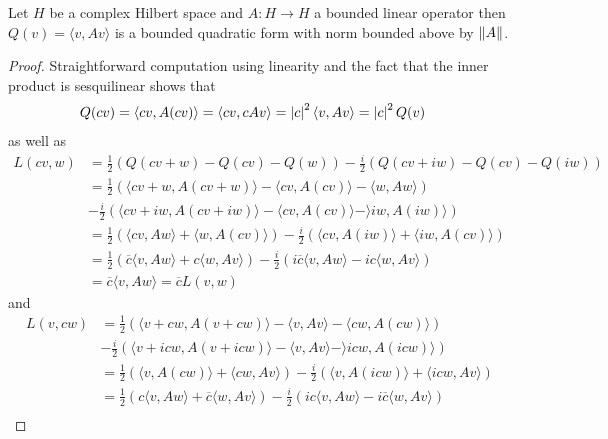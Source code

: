 \begin{prop}\label{hilbert:QuadraticFormFromOperator}Let $H$ be a complex Hilbert space and $A : H \to H$ a bounded linear operator then $Q(v) = \langle v, A v \rangle$ is a bounded quadratic form with norm bounded above by $\left \lVert A \right \rVert$.
\end{prop}
\begin{proof}
Straightforward computation using linearity and the fact that the inner product is sesquilinear shows that 
\begin{align*}
Q(cv) &= \langle cv, A (cv) \rangle = \langle cv, c A v \rangle = \left \vert c \right \vert^2 \langle v, A v \rangle = \left \vert c \right \vert^2Q(v)
\end{align*}
as well as 
\begin{align*}
L(cv, w) &= \frac{1}{2} \left ( Q(cv+w) - Q(cv) - Q(w) \right) - \frac{i}{2} \left (Q(cv+iw) - Q(cv) - Q(iw) \right) \\
&= \frac{1}{2} \left ( \langle cv+w, A(cv+w) \rangle - \langle cv, A(cv) \rangle - \langle w, Aw \rangle \right) \\
&- \frac{i}{2} \left ( \langle cv+iw, A(cv + iw) \rangle - \langle cv, A(cv) \rangle - \rangle iw, A(iw) \rangle \right) \\
&= \frac{1}{2} \left ( \langle cv, Aw \rangle + \langle w, A(cv) \rangle \right) - \frac{i}{2} \left ( \langle cv, A(iw) \rangle + \langle iw, A(cv) \rangle \right) \\
&= \frac{1}{2} \left ( \overline{c} \langle v, Aw \rangle + c \langle w, Av \rangle \right) - \frac{i}{2} \left ( i \overline{c} \langle v, Aw \rangle - ic\langle w, Av \rangle \right) \\
&= \overline{c} \langle v, Aw \rangle = \overline{c} L(v,w)
\end{align*}
and
\begin{align*}
L(v, cw) 
&= \frac{1}{2} \left ( \langle v+cw, A(v+cw) \rangle - \langle v, Av \rangle - \langle cw, A(cw)\rangle \right) \\
&- \frac{i}{2} \left ( \langle v+icw, A(v + icw) \rangle - \langle v, Av \rangle - \rangle icw, A(icw) \rangle \right) \\
&= \frac{1}{2} \left ( \langle v, A(cw) \rangle + \langle cw, Av \rangle \right) - \frac{i}{2} \left ( \langle v, A(icw) \rangle + \langle icw, Av \rangle \right) \\
&= \frac{1}{2} \left ( c \langle v, Aw \rangle + \overline{c} \langle w, Av \rangle \right) - \frac{i}{2} \left ( i c \langle v, Aw \rangle - i\overline{c}\langle w, Av \rangle \right) \\

\end{align*}
\end{proof}
